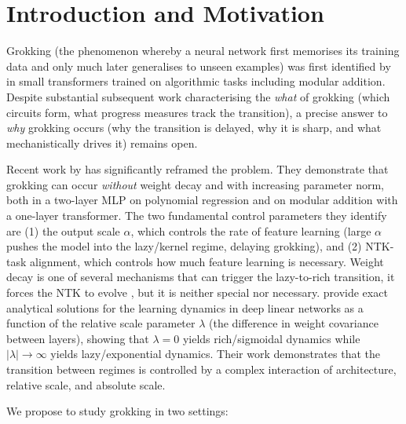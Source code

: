\documentclass[11pt,a4paper]{article}
\begin{document}
\tableofcontents
\newpage

\section{Introduction and Motivation}

Grokking (the phenomenon whereby a neural network first memorises its training data and only much later generalises to unseen examples) was first identified by \citet{power2022grokking} in small transformers trained on algorithmic tasks including modular addition. Despite substantial subsequent work characterising the \emph{what} of grokking (which circuits form, what progress measures track the transition), a precise answer to \emph{why} grokking occurs (why the transition is delayed, why it is sharp, and what mechanistically drives it) remains open.

Recent work by \citet{kumar2024grokking} has significantly reframed the problem. They demonstrate that grokking can occur \emph{without} weight decay and with increasing parameter norm, both in a two-layer MLP on polynomial regression and on modular addition with a one-layer transformer. The two fundamental control parameters they identify are (1) the output scale $\alpha$, which controls the rate of feature learning (large $\alpha$ pushes the model into the lazy/kernel regime, delaying grokking), and (2) NTK-task alignment, which controls how much feature learning is necessary. Weight decay is one of several mechanisms that can trigger the lazy-to-rich transition, it forces the NTK to evolve \citep{lewkowycz2020large}, but it is neither special nor necessary. \citet{domine2025lazy} provide exact analytical solutions for the learning dynamics in deep linear networks as a function of the relative scale parameter $\lambda$ (the difference in weight covariance between layers), showing that $\lambda = 0$ yields rich/sigmoidal dynamics while $|\lambda| \to \infty$ yields lazy/exponential dynamics. Their work demonstrates that the transition between regimes is controlled by a complex interaction of architecture, relative scale, and absolute scale.

We propose to study grokking in two settings:
\end{document}
